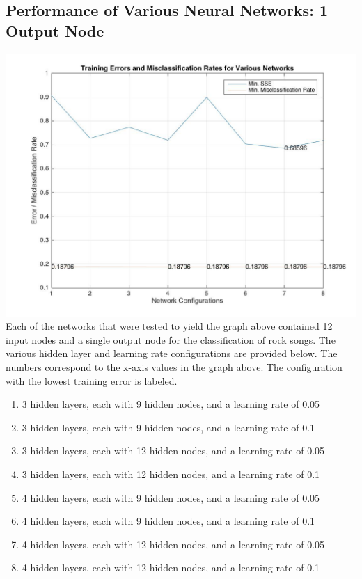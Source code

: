 \documentclass[12pt]{article}
\begin{document}
\subsection{Performance of Various Neural Networks: 1 Output Node}
\label{subsec:variousANN}
\includegraphics[scale=0.45]{images/ann/graphOfVariousNetworksWith1Genre}
Each of the networks that were tested to yield the graph above contained 12 input nodes and a single output node for the classification of rock songs. The various hidden layer and learning rate configurations are provided below. The numbers correspond to the x-axis values in the graph above. The configuration with the lowest training error is labeled. 
\begin{enumerate}
    \item 3 hidden layers, each with 9 hidden nodes, and a learning rate of 0.05
    \item 3 hidden layers, each with 9 hidden nodes, and a learning rate of 0.1
    \item 3 hidden layers, each with 12 hidden nodes, and a learning rate of 0.05
    \item 3 hidden layers, each with 12 hidden nodes, and a learning rate of 0.1
    \item 4 hidden layers, each with 9 hidden nodes, and a learning rate of 0.05
    \item 4 hidden layers, each with 9 hidden nodes, and a learning rate of 0.1
    \item 4 hidden layers, each with 12 hidden nodes, and a learning rate of 0.05
    \item 4 hidden layers, each with 12 hidden nodes, and a learning rate of 0.1
\end{enumerate}
\end{document}
